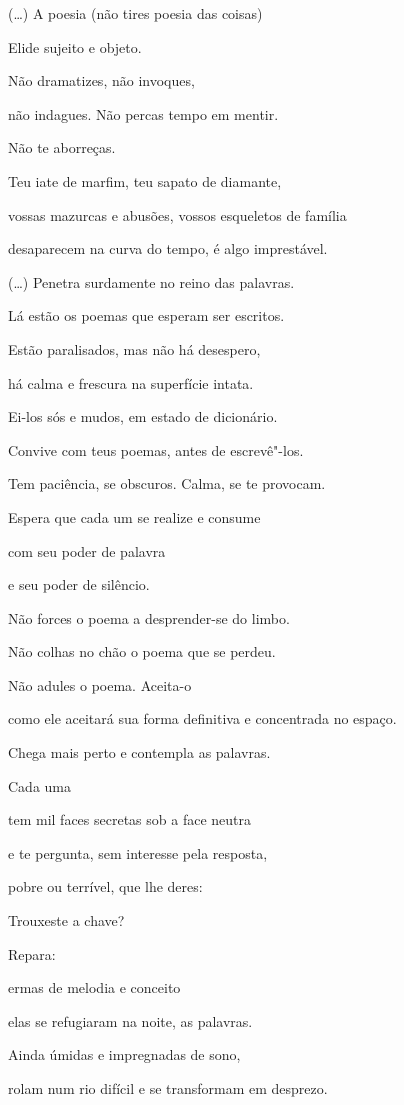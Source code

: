 (\ldots{}) A poesia (não tires poesia das coisas)

Elide sujeito e objeto.

Não dramatizes, não invoques,

não indagues. Não percas tempo em mentir.

Não te aborreças.

Teu iate de marfim, teu sapato de diamante,

vossas mazurcas e abusões, vossos esqueletos de família

desaparecem na curva do tempo, é algo imprestável.

(\ldots{}) Penetra surdamente no reino das palavras.

Lá estão os poemas que esperam ser escritos.

Estão paralisados, mas não há desespero,

há calma e frescura na superfície intata.

Ei-los sós e mudos, em estado de dicionário.

Convive com teus poemas, antes de escrevê"-los.

Tem paciência, se obscuros. Calma, se te provocam.

Espera que cada um se realize e consume

com seu poder de palavra

e seu poder de silêncio.

Não forces o poema a desprender-se do limbo.

Não colhas no chão o poema que se perdeu.

Não adules o poema. Aceita-o

como ele aceitará sua forma definitiva e concentrada no espaço.

Chega mais perto e contempla as palavras.

Cada uma

tem mil faces secretas sob a face neutra

e te pergunta, sem interesse pela resposta,

pobre ou terrível, que lhe deres:

Trouxeste a chave?

Repara:

ermas de melodia e conceito

elas se refugiaram na noite, as palavras.

Ainda úmidas e impregnadas de sono,

rolam num rio difícil e se transformam em desprezo.


